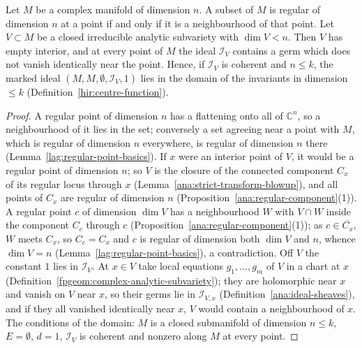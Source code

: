 \begin{lemma}
\label{mc:subvariety-thin}
\leanok
Let \(M\) be a complex manifold of dimension \(n\). A subset of \(M\) is regular of dimension \(n\) at a point if and only if it is a neighbourhood of that point.
Let \(V\subset M\) be a closed irreducible analytic subvariety with \(\dim V<n\). Then \(V\) has empty interior, and at every point of \(M\) the ideal
\(\mathcal I_V\) contains a germ which does not vanish identically near the point. Hence, if \(\mathcal I_V\) is coherent and \(n\le k\), the marked ideal
\((M,M,\emptyset,\mathcal I_V,1)\) lies in the domain of the invariants in dimension \(\le k\) (Definition~\ref{hir:centre-function}).
\end{lemma}
\begin{proof}
\leanok
A regular point of dimension \(n\) has a flattening onto all of \(\mathbb C^n\), so a neighbourhood of it lies in the set; conversely a set agreeing near a point
with \(M\), which is regular of dimension \(n\) everywhere, is regular of dimension \(n\) there (Lemma~\ref{lag:regular-point-basics}). If \(x\) were an interior point of
\(V\), it would be a regular point of dimension \(n\); so \(V\) is the closure of the connected component \(C_x\) of its regular locus through \(x\)
(Lemma~\ref{ana:strict-transform-blowup}), and all points of \(C_x\) are regular of dimension \(n\) (Proposition~\ref{ana:regular-component}(1)). A regular point \(c\)
of dimension \(\dim V\) has a neighbourhood \(W\) with \(V\cap W\) inside the component \(C_c\) through \(c\) (Proposition~\ref{ana:regular-component}(1)); as
\(c\in\overline{C_x}\), \(W\) meets \(C_x\), so \(C_c=C_x\) and \(c\) is regular of dimension both \(\dim V\) and \(n\), whence \(\dim V=n\)
(Lemma~\ref{lag:regular-point-basics}), a contradiction. Off \(V\) the constant \(1\) lies in \(\mathcal I_V\). At \(x\in V\) take local equations
\(g_1,\dots,g_m\) of \(V\) in a chart at \(x\) (Definition~\ref{fpgeom:complex-analytic-subvariety}); they are holomorphic near \(x\) and vanish on \(V\) near \(x\), so their
germs lie in \(\mathcal I_{V,x}\) (Definition~\ref{ana:ideal-sheaves}), and if they all vanished identically near \(x\), \(V\) would contain a neighbourhood of \(x\). The
conditions of the domain: \(M\) is a closed submanifold of dimension \(n\le k\), \(E=\emptyset\), \(d=1\), \(\mathcal I_V\) is coherent and nonzero along \(M\) at
every point.
\end{proof}

